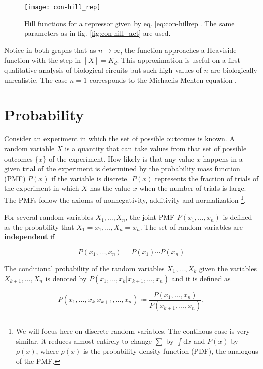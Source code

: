 \begin{figure}[H]
  \centering
  \texttt{[image: con-hill\_rep]}
  \caption[Hill functions for a repressor]{\label{fig:con-hill_rep} Hill functions for a repressor given by eq. \eqref{eq:con-hillrep}. The same parameters as in fig. \ref{fig:con-hill_act} are used.}
\end{figure}

Notice in both graphs that as $n\rightarrow\infty$, the function approaches a Heaviside function with the step in $[X] = K_d$. This approximation is useful on a first qualitative analysis of biological circuits but such high values of $n$ are biologically unrealistic. The case $n=1$ corresponds to the Michaelis-Menten equation \cite{alon06}.

\section{Probability}

Consider an experiment in which the set of possible outcomes is known. A random variable $X$ is a quantity that can take values from that set of possible outcomes $\{x\}$ of the experiment. How likely is that any value $x$ happens in a given trial of the experiment is determined by the probability mass function (PMF) $P(x)$ if the variable is discrete. $P(x)$ represents the fraction of trials of the experiment in which $X$ has the value $x$ when the number of trials is large. The PMFs follow the axioms of nonnegativity, additivity and normalization \cite{bertsekas08} \footnote{We will focus here on discrete random variables. The continous case is very similar, it reduces almost entirely to change $\sum$ by $\int\mathrm{d}x$ and $P(x)$ by $\rho(x)$, where $\rho(x)$ is the probability density function (PDF), the analogous of the PMF.}.

For several random variables $X_1,\dotsc,X_n$, the joint PMF  $P(x_1,\dotsc,x_n)$ is defined as the probability that $X_1=x_1,\dotsc,X_n=x_n$. The set of random variables are \textbf{independent} if

\begin{equation*}
  P(x_1,\dotsc,x_n) = P(x_1)\dotsm P(x_n)
\end{equation*}

The conditional probability of the random variables $X_1,\dotsc,X_k$ given the variables $X_{k+1},\dotsc,X_n$ is denoted by $P(x_1,\dotsc,x_k|x_{k+1},\dotsc,x_n)$ and it is defined as

\begin{equation*}
  P(x_1,\dotsc,x_k|x_{k+1},\dotsc,x_n) \coloneqq \frac{P(x_1,\dotsc,x_n)}{P(x_{k+1},\dotsc,x_n)},
\end{equation*}

